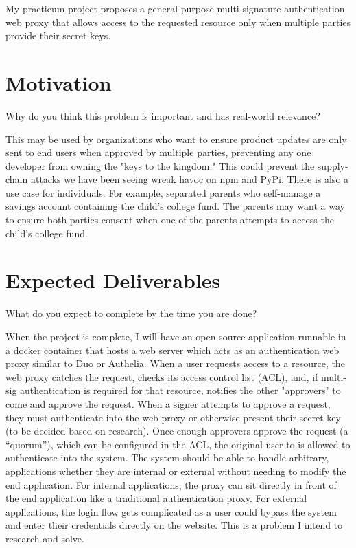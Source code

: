 \documentclass[12pt]{article}
\begin{document}
My practicum project proposes a general-purpose multi-signature authentication web proxy that allows access to the requested resource only when multiple parties provide their secret keys.

\section{Motivation}

{\small Why do you think this problem is important and has real-world relevance?}

This may be used by organizations who want to ensure product updates are only sent to end users when approved by multiple parties, preventing any one developer from owning the "keys to the kingdom." This could prevent the supply-chain attacks we have been seeing wreak havoc on npm and PyPi. There is also a use case for individuals. For example, separated parents who self-manage a savings account containing the child's college fund. The parents may want a way to ensure both parties consent when one of the parents attempts to access the child's college fund.

\section{Expected Deliverables}

{\small What do you expect to complete by the time you are done?}

When the project is complete, I will have an open-source application runnable in a docker container that hosts a web server which acts as an authentication web proxy similar to Duo or Authelia. When a user requests access to a resource, the web proxy catches the request, checks its access control list (ACL), and, if multi-sig authentication is required for that resource, notifies the other "approvers" to come and approve the request. When a signer attempts to approve a request, they must authenticate into the web proxy or otherwise present their secret key (to be decided based on research). Once enough approvers approve the request (a ``quorum''), which can be configured in the ACL, the original user to is allowed to authenticate into the system. The system should be able to handle arbitrary, applications whether they are internal or external without needing to modify the end application. For internal applications, the proxy can sit directly in front of the end application like a traditional authentication proxy. For external applications, the login flow gets complicated as a user could bypass the system and enter their credentials directly on the website. This is a problem I intend to research and solve.
\end{document}
